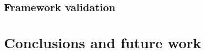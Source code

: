 \documentclass[12pt,journal,compsoc]{IEEEtran}
\begin{document}
\subsection{Framework validation}


\section{Conclusions and future work}
\label{ccl}





%

%

\end{document}

